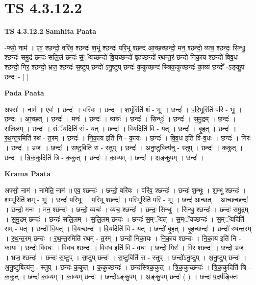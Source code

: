 \documentclass[17pt]{extarticle}
\begin{document}
\section{ TS 4.3.12.2 }

\textbf{TS 4.3.12.2 } \newline
\textbf{Samhita Paata} \newline

-फ्सो॒ नाम॑ । एव॒ श्छन्दो॒ वरि॑व॒ श्छन्दः॑ श॒भूं श्छन्दः॑ परि॒भू श्छन्द॑ आ॒च्छच्छन्दो॒ मन॒ श्छन्दो॒ व्यच॒ श्छन्दः॒ सिन्धु॒ श्छन्दः॑ समु॒द्रं छन्दः॑ सलि॒लं छन्दः॑ सं॒ॅयच्छन्दो॑ वि॒यच्छन्दो॑ बृ॒हच्छन्दो॑ रथन्त॒रं छन्दो॑ निका॒य श्छन्दो॑ विव॒ध श्छन्दो॒ गिर॒ श्छन्दो॒ भ्रज॒ श्छन्दः॑ स॒ष्टुप् छन्दो॑ ऽनु॒ष्टुप् छन्दः॑ क॒कुच्छन्द॑ स्त्रिक॒कुच्छन्दः॑ का॒व्यं छन्दो᳚ -ऽङ्कु॒पं छन्दः॑ - [  ] \newline

\textbf{Pada Paata} \newline

अफ्सः॑ । नाम॑ ॥ एवः॑ । छन्दः॑ । वरि॑वः । छन्दः॑ । श॒भूंरिति॑ शं - भूः । छन्दः॑ । प॒रि॒भूरिति॑ परि - भूः । छन्दः॑ । आ॒च्छत् । छन्दः॑ । मनः॑ । छन्दः॑ । व्यचः॑ । छन्दः॑ । सिन्धुः॑ । छन्दः॑ । स॒मु॒द्रम् । छन्दः॑ । स॒लि॒लम् । छन्दः॑ । सं॒ॅयदिति॑ सं - यत् । छन्दः॑ । वि॒यदिति॑ वि - यत् । छन्दः॑ । बृ॒हत् । छन्दः॑ । र॒थ॒न्त॒रमिति॑ रथं - त॒रम् । छन्दः॑ । नि॒का॒य इति॑ नि - का॒यः । छन्दः॑ । वि॒व॒ध इति॑ वि-व॒धः । छन्दः॑ । गिरः॑ । छन्दः॑ । भ्रजः॑ । छन्दः॑ । स॒ष्टुबिति॑ स - स्तुप् । छन्दः॑ । अ॒नु॒ष्टुबित्य॑नु - स्तुप् । छन्दः॑ । क॒कुत् । छन्दः॑ । त्रि॒क॒कुदिति॑ त्रि - क॒कुत् । छन्दः॑ । का॒व्यम् । छन्दः॑ । अ॒ङ्कु॒पम् । छन्दः॑ ।  \newline


\textbf{Krama Paata} \newline

अफ्सो॒ नाम॑ । नामेति॒ नाम॑ ॥ एव॒ श्छन्दः॑ । छन्दो॒ वरि॑वः । वरि॑व॒ श्छन्दः॑ । छन्दः॑ श॒म्भूः । श॒म्भू श्छन्दः॑ । श॒म्भूरिति॑ शम् - भूः । छन्दः॑ परि॒भूः । प॒रि॒भू श्छन्दः॑ । प॒रि॒भूरिति॑ परि - भूः । छन्द॑ आ॒च्छत् । आ॒च्छच्छन्दः॑ । छन्दो॒ मनः॑ । मन॒ श्छन्दः॑ । छन्दो॒ व्यचः॑ । व्यच॒ श्छन्दः॑ । छन्दः॒ सिन्धुः॑ । सिन्धु॒ श्छन्दः॑ । छन्दः॑ समु॒द्रम् । स॒मु॒द्रम् छन्दः॑ । छन्दः॑ सलि॒लम् । स॒लि॒लम् छन्दः॑ । छन्दः॑ स॒म्ॅयत् । स॒म्ॅयच्छन्दः॑ । स॒म्ॅयदिति॑ सम् - यत् । छन्दो॑ वि॒यत् । वि॒यच्छन्दः॑ । वि॒यदिति॑ वि - यत् । छन्दो॑ बृ॒हत् । बृ॒हच्छन्दः॑ । छन्दो॑ रथन्त॒रम् । र॒थ॒न्त॒रम् छन्दः॑ । र॒थ॒न्त॒रमिति॑ रथम् - त॒रम् । छन्दो॑ निका॒यः । नि॒का॒य श्छन्दः॑ । नि॒का॒य इति॑ नि - का॒यः । छन्दो॑ विव॒धः । वि॒व॒ध श्छन्दः॑ । वि॒व॒ध इति॑ वि - व॒धः । छन्दो॒ गिरः॑ । गिर॒ श्छन्दः॑ । छन्दो॒ भ्रजः॑ । भ्रज॒ श्छन्दः॑ । छन्दः॑ स॒ष्टुप् । स॒ष्टुप् छन्दः॑ । स॒ष्टुबिति॑ स - स्तुप् । छन्दो॑ऽनु॒ष्टुप् । अ॒नु॒ष्टुप् छन्दः॑ । अ॒नु॒ष्टुबित्य॑नु - स्तुप् । छन्दः॑ क॒कुत् । क॒कुच्छन्दः॑ । छन्द॑स्त्रिक॒कुत् । त्रि॒क॒कुच्छन्दः॑ । त्रि॒क॒कुदिति॑ त्रि - क॒कुत् । छन्दः॑ का॒व्यम् । का॒व्यम् छन्दः॑ । छन्दो᳚ऽङ्कु॒पम् । अ॒ङ्कु॒पम् छन्दः॑ ( ) । छन्दः॑ प॒दप॑ङ्क्तिः \newline
\end{document}
